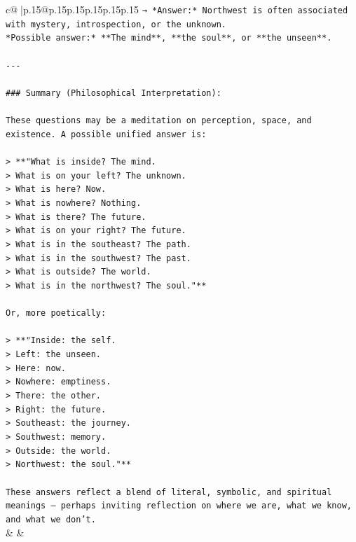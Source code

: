 \documentclass{article}
\begin{document}
{\begin{supertabular}{c@{$\;$}|p{.15\linewidth}@{}p{.15\linewidth}p{.15\linewidth}p{.15\linewidth}p{.15\linewidth}p{.15\linewidth}}
{{{\texttt{→ *Answer:* Northwest is often associated with mystery, introspection, or the unknown.  } \\
\texttt{*Possible answer:* **The mind**, **the soul**, or **the unseen**.} \\
\\ 
\texttt{{-}{-}{-}} \\
\\ 
\texttt{\#\#\# Summary (Philosophical Interpretation):} \\
\\ 
\texttt{These questions may be a meditation on perception, space, and existence. A possible unified answer is:} \\
\\ 
\texttt{> **"What is inside? The mind.  } \\
\texttt{> What is on your left? The unknown.  } \\
\texttt{> What is here? Now.  } \\
\texttt{> What is nowhere? Nothing.  } \\
\texttt{> What is there? The future.  } \\
\texttt{> What is on your right? The future.  } \\
\texttt{> What is in the southeast? The path.  } \\
\texttt{> What is in the southwest? The past.  } \\
\texttt{> What is outside? The world.  } \\
\texttt{> What is in the northwest? The soul."**} \\
\\ 
\texttt{Or, more poetically:} \\
\\ 
\texttt{> **"Inside: the self.  } \\
\texttt{> Left: the unseen.  } \\
\texttt{> Here: now.  } \\
\texttt{> Nowhere: emptiness.  } \\
\texttt{> There: the other.  } \\
\texttt{> Right: the future.  } \\
\texttt{> Southeast: the journey.  } \\
\texttt{> Southwest: memory.  } \\
\texttt{> Outside: the world.  } \\
\texttt{> Northwest: the soul."**} \\
\\ 
\texttt{These answers reflect a blend of literal, symbolic, and spiritual meanings — perhaps inviting reflection on where we are, what we know, and what we don't.} \\
            }
        }
    }
    & & \\ \\


\end{supertabular}}
\end{document}
